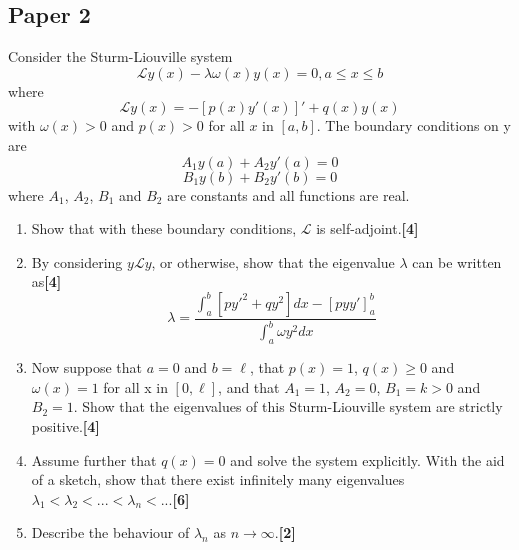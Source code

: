 \documentclass[a4paper]{article}
\begin{document}
\subsection{Paper 2}
\begin{qns}
Consider the Sturm-Liouville system
$$\mathcal{L}y(x)-\lambda\omega(x)y(x)=0,a\leq x\leq b$$
where
$$\mathcal{L}y(x) = −[p(x)y'(x)]' + q(x)y(x)$$
with $\omega(x) > 0$ and $p(x) > 0$ for all $x$ in $[a, b]$. The boundary conditions on y are
$$A_1 y(a) + A_2 y'(a) = 0$$
$$B_1 y(b) + B_2 y'(b) = 0$$
where $A_1$, $A_2$, $B_1$ and $B_2$ are constants and all functions are real.
\begin{enumerate}[label=(\alph*)]
\item Show that with these boundary conditions, $\mathcal{L}$ is self-adjoint.\hfill\textbf{[4]}
\item By considering $y\mathcal{L}y$, or otherwise, show that the eigenvalue $\lambda$ can be written as\hfill\textbf{[4]}
$$\lambda=\frac{\int_a^b[py'^2+qy^2]dx-[pyy']_a^b}{\int_a^b\omega y^2dx}$$
\item Now suppose that $a = 0$ and $b =\ell$, that $p(x) = 1$, $q(x)\geq 0$ and $\omega(x) = 1$ for all x in $[0,\ell]$, and that $A_1 = 1$, $A_2 = 0$, $B_1 = k > 0$ and $B_2 = 1$. Show that the eigenvalues of this Sturm-Liouville system are strictly positive.\hfill\textbf{[4]}
\item Assume further that $q(x) = 0$ and solve the system explicitly. With the aid of a sketch, show that there exist infinitely many eigenvalues $\lambda_1<\lambda_2<...<\lambda_n<...$\hfill\textbf{[6]}
\item Describe the behaviour of $\lambda_n$ as $n\rightarrow\infty$.\hfill\textbf{[2]}
\end{enumerate}
\end{qns}
\end{document}

